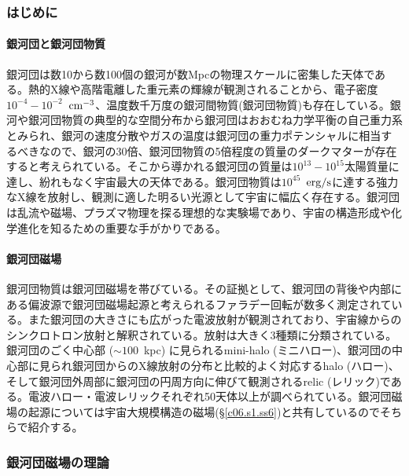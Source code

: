 \subsubsection{はじめに}
\label{c06.s1.ss5.sss1}

\paragraph{銀河団と銀河団物質}

銀河団は数10から数100個の銀河が数Mpcの物理スケールに密集した天体である。熱的X線や高階電離した重元素の輝線が観測されることから、電子密度$10^{-4}-10^{-2}$~${\rm cm^{-3}}$、温度数千万度の銀河間物質(銀河団物質)も存在している。銀河や銀河団物質の典型的な空間分布から銀河団はおおむね力学平衡の自己重力系とみられ、銀河の速度分散やガスの温度は銀河団の重力ポテンシャルに相当するべきなので、銀河の30倍、銀河団物質の5倍程度の質量のダークマターが存在すると考えられている。そこから導かれる銀河団の質量は$10^{13}-10^{15}$太陽質量に達し、紛れもなく宇宙最大の天体である。銀河団物質は$10^{45}$~${\rm erg/s}$に達する強力なX線を放射し、観測に適した明るい光源として宇宙に幅広く存在する。銀河団は乱流や磁場、プラズマ物理を探る理想的な実験場であり、宇宙の構造形成や化学進化を知るための重要な手がかりである。

\paragraph{銀河団磁場}

銀河団物質は銀河団磁場を帯びている。その証拠として、銀河団の背後や内部にある偏波源で銀河団磁場起源と考えられるファラデー回転が数多く測定されている。また銀河団の大きさにも広がった電波放射が観測されており、宇宙線からのシンクロトロン放射と解釈されている。放射は大きく3種類に分類されている。銀河団のごく中心部 ($\sim 100$~kpc) に見られるmini-halo (ミニハロー)、銀河団の中心部に見られ銀河団からのX線放射の分布と比較的よく対応するhalo (ハロー)、そして銀河団外周部に銀河団の円周方向に伸びて観測されるrelic (レリック)である。電波ハロー・電波レリックそれぞれ50天体以上が調べられている\citep{2012A&ARv..20...54F}。銀河団磁場の起源については宇宙大規模構造の磁場(\S \ref{c06.s1.ss6})と共有しているのでそちらで紹介する。

\subsubsection{銀河団磁場の理論}
\label{c06.s1.ss5.sss2}

